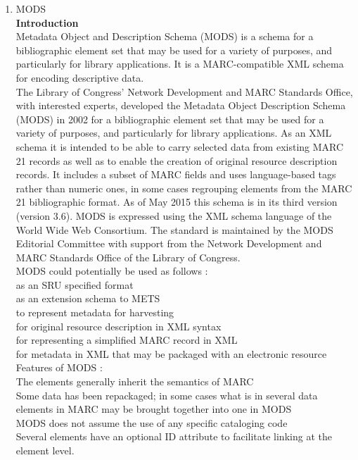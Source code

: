 \begin{enumerate}
	\item MODS\\
	{\bf Introduction}\\
	Metadata Object and Description Schema (MODS) is a schema for a bibliographic element set that may be used for a variety of purposes, and particularly for library applications. It is a MARC-compatible XML schema for encoding descriptive data. \\
	The Library of Congress' Network Development and MARC Standards Office, with interested experts, developed the Metadata Object Description Schema (MODS) in 2002 for a bibliographic element set that may be used for a variety of purposes, and particularly for library applications. As an XML schema it is intended to be able to carry selected data from existing MARC 21 records as well as to enable the creation of original resource description records. It includes a subset of MARC fields and uses language-based tags rather than numeric ones, in some cases regrouping elements from the MARC 21 bibliographic format. As of May 2015 this schema is in its third version (version 3.6). MODS is expressed using the XML schema language of the World Wide Web Consortium. The standard is maintained by the MODS Editorial Committee with support from the Network Development and MARC Standards Office of the Library of Congress.\\
	MODS could potentially be used as follows :\\	
	as an SRU specified format\\
	as an extension schema to METS\\
	to represent metadata for harvesting\\
	for original resource description in XML syntax\\
	for representing a simplified MARC record in XML\\
	for metadata in XML that may be packaged with an electronic resource\\
	Features of MODS :\\
	The elements generally inherit the semantics of MARC\\
	Some data has been repackaged; in some cases what is in several data elements in MARC may be brought together into one in MODS\\
	MODS does not assume the use of any specific cataloging code\\
	Several elements have an optional ID attribute to facilitate linking at the element level.\\

\end{enumerate}
